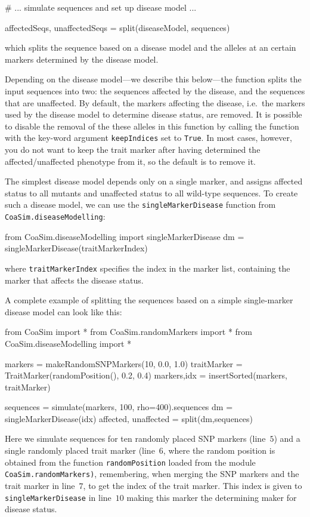 \documentclass{manual}
\begin{document}
\begin{empfile}
\begin{code}
# ... simulate sequences and set up disease model ...

affectedSeqs, unaffectedSeqs = split(diseaseModel, sequences)
\end{code}
which splits the sequence based on a disease model and the alleles at
an certain markers determined by the disease model. 

Depending on the disease model---we describe this below---the function
splits the input sequences into two: the sequences affected by the
disease, and the sequences that are unaffected.  By default, the
markers affecting the disease, i.e.\ the markers used by the disease
model to determine disease status, are removed.  It is possible to
disable the removal of the these alleles in this function by calling
the function with the key-word argument \texttt{keepIndices} set to
\texttt{True}.  In most cases, however, you do not want to keep the
trait marker after having determined the affected/unaffected phenotype
from it, so the default is to remove it.

The simplest disease model depends only on a single marker, and
assigns affected status to all mutants and unaffected status to all
wild-type sequences.  To create such a disease model, we can use the
\texttt{singleMarkerDisease} function from
\texttt{CoaSim.diseaseModelling}:
\begin{code}
from CoaSim.diseaseModelling import singleMarkerDisease
dm = singleMarkerDisease(traitMarkerIndex)
\end{code}
where \texttt{traitMarkerIndex} specifies the index in the marker
list, containing the marker that affects the disease status.

A complete example of splitting the sequences based on a simple
single-marker disease model can look like this:
\begin{ncode}
from CoaSim import *
from CoaSim.randomMarkers import *
from CoaSim.diseaseModelling import *

markers = makeRandomSNPMarkers(10, 0.0, 1.0)
traitMarker = TraitMarker(randomPosition(), 0.2, 0.4)
markers,idx = insertSorted(markers, traitMarker)

sequences = simulate(markers, 100, rho=400).sequences
dm = singleMarkerDisease(idx)
affected, unaffected = split(dm,sequences)
\end{ncode}

Here we simulate sequences for ten randomly placed SNP markers
(line~$5$) and a single randomly placed trait marker (line~$6$, where
the random position is obtained from the function
\texttt{randomPosition} loaded from the module
\texttt{CoaSim.randomMarkers)}, remembering, when merging the SNP
markers and the trait marker in line~$7$, to get the index of the
trait marker.  This index is given to \texttt{singleMarkerDisease} in
line~$10$ making this marker the determining maker for disease status.
 

\end{empfile}
\end{document}
